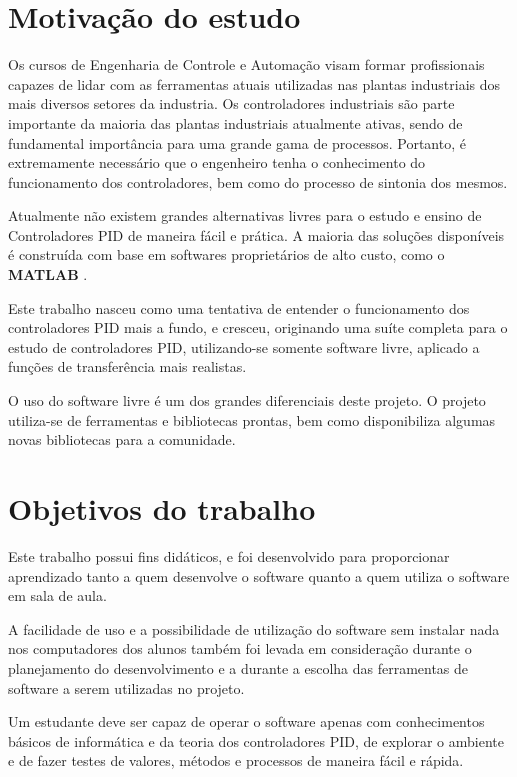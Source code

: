 \section{Motivação do estudo}

    Os cursos de Engenharia de Controle e Automação visam formar profissionais
    capazes de lidar com as ferramentas atuais utilizadas nas plantas industriais
    dos mais diversos setores da industria. Os controladores industriais são
    parte importante da maioria das plantas industriais atualmente ativas,
    sendo de fundamental importância para uma grande gama de processos. Portanto,
    é extremamente necessário que o engenheiro tenha o conhecimento do funcionamento
    dos controladores, bem como do processo de sintonia dos mesmos.
    
    Atualmente não existem grandes alternativas livres para o estudo e ensino
    de Controladores PID de maneira fácil e prática. A maioria das soluções
    disponíveis é construída com base em softwares proprietários de alto custo,
    como o \textbf{MATLAB} \textsuperscript{\textregistered}.
    
    Este trabalho nasceu como uma tentativa de entender o funcionamento dos
    controladores PID mais a fundo, e cresceu, originando uma suíte completa
    para o estudo de controladores PID, utilizando-se somente software livre,
    aplicado a funções de transferência mais realistas.

    O uso do software livre é um dos grandes diferenciais deste projeto. O projeto
    utiliza-se de ferramentas e bibliotecas prontas, bem como disponibiliza algumas
    novas bibliotecas para a comunidade.

\section{Objetivos do trabalho}

    Este trabalho possui fins didáticos, e foi desenvolvido para proporcionar
    aprendizado tanto a quem desenvolve o software quanto a quem utiliza o software
    em sala de aula.
    
    A facilidade de uso e a possibilidade de utilização do software sem instalar
    nada nos computadores dos alunos também foi levada em consideração durante o
    planejamento do desenvolvimento e a durante a escolha das ferramentas de software
    a serem utilizadas no projeto.
    
    Um estudante deve ser capaz de operar o software apenas com conhecimentos
    básicos de informática e da teoria dos controladores \acs{PID}, de explorar o
    ambiente e de fazer testes de valores, métodos e processos de maneira fácil e
    rápida.
    
